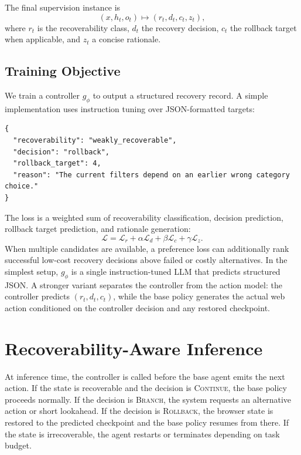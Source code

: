 \documentclass[11pt]{article}
\begin{document}
The final supervision instance is
\begin{equation}
(x,h_t,o_t) \mapsto (r_t,d_t,c_t,z_t),
\end{equation}
where $r_t$ is the recoverability class, $d_t$ the recovery decision, $c_t$ the rollback target when applicable, and $z_t$ a concise rationale.

\subsection{Training Objective}
We train a controller $g_\phi$ to output a structured recovery record. A simple implementation uses instruction tuning over JSON-formatted targets:
\begin{verbatim}
{
  "recoverability": "weakly_recoverable",
  "decision": "rollback",
  "rollback_target": 4,
  "reason": "The current filters depend on an earlier wrong category choice."
}
\end{verbatim}
The loss is a weighted sum of recoverability classification, decision prediction, rollback target prediction, and rationale generation:
\begin{equation}
\mathcal{L}=\mathcal{L}_{r}+\alpha\mathcal{L}_{d}+\beta\mathcal{L}_{c}+\gamma\mathcal{L}_{z}.
\end{equation}
When multiple candidates are available, a preference loss can additionally rank successful low-cost recovery decisions above failed or costly alternatives. In the simplest setup, $g_\phi$ is a single instruction-tuned LLM that predicts structured JSON. A stronger variant separates the controller from the action model: the controller predicts $(r_t,d_t,c_t)$, while the base policy generates the actual web action conditioned on the controller decision and any restored checkpoint.

\section{Recoverability-Aware Inference}
At inference time, the controller is called before the base agent emits the next action. If the state is recoverable and the decision is \textsc{Continue}, the base policy proceeds normally. If the decision is \textsc{Branch}, the system requests an alternative action or short lookahead. If the decision is \textsc{Rollback}, the browser state is restored to the predicted checkpoint and the base policy resumes from there. If the state is irrecoverable, the agent restarts or terminates depending on task budget.
\end{document}
